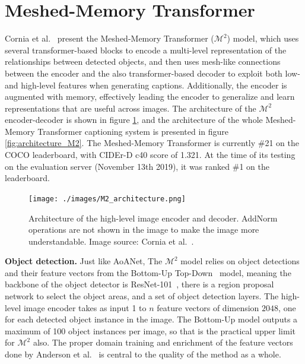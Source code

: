 \documentclass[english,twoside,openright]{HYgraduMLDS}
\begin{document}
\section{Meshed-Memory Transformer}
\label{section:Meshed-Memory_Transformer}
Cornia et al.~\cite{M2} present the Meshed-Memory Transformer ($\mathcal{M}^2$) model, which uses several transformer-based blocks to encode a multi-level representation of the relationships between detected objects, and then uses mesh-like connections between the encoder and the also transformer-based decoder to exploit both low- and high-level features when generating captions. Additionally, the encoder is augmented with memory, effectively leading the encoder to generalize and learn representations that are useful across images. The architecture of the $\mathcal{M}^2$ encoder-decoder is shown in figure \ref{fig:architecture_sub_M2}, and the architecture of the whole Meshed-Memory Transformer captioning system is presented in figure \ref{fig:architecture_M2}. The Meshed-Memory Transformer is currently \#21 on the COCO leaderboard, with CIDEr-D c40 score of 1.321. At the time of its testing on the evaluation server (November 13th 2019), it was ranked \#1 on the leaderboard.

\begin{figure}[h] 
\centering
\texttt{[image: ./images/M2\_architecture.png]}
\caption{Architecture of the high-level image encoder and decoder. AddNorm operations are not shown in the image to make the image more understandable. Image source: Cornia et al.~\cite{M2}.}
\label{fig:architecture_sub_M2} 
\end{figure}

\textbf{Object detection.} Just like AoANet, The $\mathcal{M}^2$ model relies on object detections and their feature vectors from the Bottom-Up Top-Down~\cite{BottomUp} model, meaning the backbone of the object detector is ResNet-101~\cite{ResNet}, there is a region proposal network to select the object areas, and a set of object detection layers. The high-level image encoder takes as input 1 to $n$ feature vectors of dimension $2048$, one for each detected object instance in the image. The Bottom-Up model outputs a maximum of 100 object instances per image, so that is the practical upper limit for $\mathcal{M}^2$ also. The proper domain training and enrichment of the feature vectors done by Anderson et al.~\cite{BottomUp} is central to the quality of the method as a whole.
\end{document}

